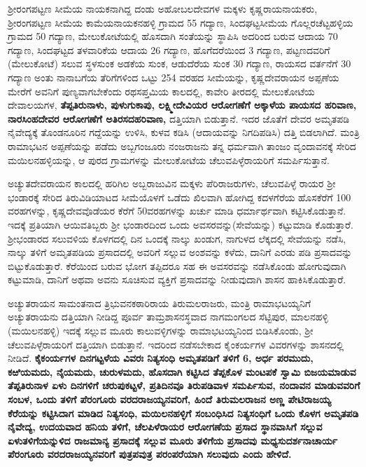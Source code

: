ಶ‍್ರೀರಂಗಪಟ್ಟಣ ಸೀಮೆಯ ನಾಯಕನಾಗಿದ್ದ ದಂಡು ಅಹೋಬಲದೇವಗಳ ಮಕ್ಕಳು ಕೃಷ್ಣರಾಯನಾಯಕರು, ಶ‍್ರೀರಂಗಪಟ್ಟಣ ಸೀಮೆಯ ಕಾಮೆಯನಾಯಕನಹಳ್ಳಿ ಗ್ರಾಮದ 55 ಗದ್ಯಾಣ, ಸಿಂದಘಟ್ಟಸೀಮೆಯ ಗೊಲ್ಲರಚೆಟ್ಟಹಳ್ಳಿಯ ಗ್ರಾಮದ 50 ಗದ್ಯಾಣ, ಮೇಲುಕೋಟೆಯಲ್ಲಿ ಹೊಸದಾಗಿ ಸಂತೆಯನ್ನು ಸ್ಥಾಪಿಸಿ ಅದರಿಂದ ಬರುವ ಆದಾಯ 70 ಗದ್ಯಾಣ, ಸಿಂದಘಟ್ಟದ ತಳವಾರಿಕೆಯ ಆದಾಯ 26 ಗದ್ಯಾಣ, ಹೊಗೆದರೆಯಿಂದ 3 ಗದ್ಯಾಣ, ಪಟ್ಟಣದವರಿಗೆ (ಮೇಲುಕೋಟೆ) ಸಲುವ ಸ್ಥಳಸುಂಕ ಅಡಕೆಯ ಸುಂಕ, ಆಡುದೆರೆಯ ಸುಂಕ 30 ಗದ್ಯಾಣ, ರಾಯಸದ ವರ್ತನೆಗೆ 30 ಗದ್ಯಾಣ ಅಂತು ನಾನಾಬಗೆಯ ತೆರಿಗೆಗಳಿಂದ ಒಟ್ಟು 254 ವರಹದ ಸೀಮೆಯನ್ನು, ಕೃಷ್ಣದೇವರಾಯನ ಅಪ್ಪಣೆಯ ಮೇರೆಗೆ ಅವನಿಗೆ ಪುಣ್ಯವಾಗಬೇಕೆಂದು ರಥಸಪ್ತಮಿಯ ಕಾಲದಲ್ಲಿ, ಕಾವೇರಿ ತೀರದಲ್ಲಿ ಮೇಲುಕೋಟೆಯ ದೇವಾಲಯಗಳ, \textbf{ತೆಪ್ಪತಿರುನಾಳು, ಪುಳುಗುಕಾಪು, ಲಕ್ಷ್ಮೀದೇವಿಯರ ಆರೋಗಣೆಗೆ ಅಕ್ಕಾಳೆಯ ಪಾಯಸದ ಹರಿವಾಣ, ನಾರಸಿಂಹದೇವರ ಆರೋಗಣೆಗೆ ಅತಿರಸದಹರಿವಾಣ, }ದತ್ತಿಯಾಗಿ ಬಿಡುತ್ತಾನೆ. ಇದರ ಜೊತೆಗೆ ದೇವರ ಅಮೃತಪಡಿ ನೈವೇದ್ಯಕ್ಕೆ ತೊಂಡನೂರಿನ ಗದ್ದೆಯನ್ನು ಉಳಿಸಿ, ಕುಳವ ಕಡಿಸಿ (ಆದಾಯವನ್ನು ನಿಗದಿಪಡಿಸಿ) ದತ್ತಿ ಬಿಡಲಾಗಿದೆ. ಮಂತ್ರಿ ರಾಮಾಭಟನ ಅಪ್ಪಣೆಯನ್ನು ಪಡೆದು ಅಬ್ಬಗಂಜೂರು ನಂಜರಾಜನು ತನ್ನ ಧರ್ಮವಾಗಿ ತಾಂಜಂ ವೃಂದಾವನಕ್ಕೆ ಸೇರಿದ ಮಯಿಲನಹಳ್ಳಿಯನ್ನು, ಆ ಪುರದ ಗ್ರಾಮಗಳನ್ನು ಮೇಲುಕೋಟೆಯ ಚೆಲುವಪಿಳ್ಳೆರಾಯರಿಗೆ ಸಮರ್ಪಿಸುತ್ತಾನೆ.

ಅಚ್ಯುತದೇವರಾಯನ ಕಾಲದಲ್ಲಿ ಹರಿಗಿಲ ಅಬ್ಬರಾಜುವಿನ ಮಕ್ಕಳು ಪೆರಿರಾಜರುಗಳು, ಚೆಲುವಪಿಳ್ಳೆ ರಾಯರ ಶ‍್ರೀ ಭಂಡಾರಕ್ಕೆ ಸೇರಿದ ತಿರುವಿಡಿಯಾಟದ ಸೀಮೆಯೊಳಗೆ ಒಡೆದು ಖಿಲವಾಗಿ ಹೋಗಿದ್ದ ಕದಳಗೆರೆಯ ಹೊಸಕೆರೆಗೆ 100 ವರಹಗಳನ್ನು, ಕೃಷ್ಣದೇವವೊಡೆಯರ ಕೆರೆಗೆ 50ವರಹಗಳನ್ನು ಖರ್ಚು ಮಾಡಿ ಧರ್ಮಾರ್ಥವಾಗಿ ಕಟ್ಟಿಸಿಕೊಡುತ್ತಾನೆ. ಇದಕ್ಕೆ ಪ್ರತಿಯಾಗಿ ಆಯಿವತಿಬ್ಬರು ಶ‍್ರೀ ಭಂಡಾರದಿಂದ ಒಂದು ಅವಸರವನ್ನು(ಸೇವೆಯನ್ನು) ಕಟ್ಟುಮಾಡಿ ಕೊಡುತ್ತಾರೆ. ಶ‍್ರೀಭಂಡಾರದ ಸಲುವಳಿಯ ಕೊಳಗದಲ್ಲಿ ದಿನ ಒಂದಕ್ಕೆ ನಾಲ್ಕು ಖಂಡುಗ, ನಾಗುಳದ ಲೆಕ್ಕದಲ್ಲಿ ಸೇವೆಯನ್ನು ನಡೆಸಿ, ನಾಲ್ಕು ತಳಿಗೆ ಅಮೃತಪಡಿಯ ಪ್ರಸಾದದಲ್ಲಿ ಅವರಿಗೆ ಸಲ್ಲುವ ಅಂಶವನ್ನು ಕಳೆದು, ದಾನಿಗೆ ಎರಡು ಪಡಿ ಪ್ರಸಾದವನ್ನು ಬಿಟ್ಟುಕೊಡುತ್ತಾರೆ. ಕೆರೆಯಿಂದ ಬರುವ ಭೋಗ ತಪ್ಪಿದರೂ ಸಹ ಈ ಅವಸರವನ್ನು ನಡೆಸಿಕೊಂಡು ಹೋಗುವುದಾಗಿ ಕಟ್ಟುಮಾಡಿ, ದಾನಿಗೆ ಅಥವಾ ಅವನು ಸೂಚಿಸುವ ವ್ಯಕ್ತಿಗೆ ಪ್ರಸಾದವನ್ನು ನೀಡುವುದಾಗಿ ಶಾಸನ ಹಾಕಿಸಿಕೊಡುತ್ತಾರೆ.

ಅಚ್ಯುತರಾಯನ ಸಾಮಂತನಾದ ತ್ರಿಭುವನಕಠಾರಿರಾಯ ತಿರುಮಲರಾಜರು, ಮಂತ್ರಿ ರಾಮಾಭಟಯ್ಯನಿಗೆ ಅಚ್ಯುತರಾಯನು ದತ್ತಿಯಾಗಿ ನೀಡಿದ್ದ ಪೂರ್ವ ತಾಮ್ರಶಾಸನಸ್ಥವಾದ ನಾಗಮಂಗಲದ ಸೆಟ್ಟಿಪುರ, ಮಾಲನಹಳ್ಳಿ (ಮಯಿಲನಹಳ್ಳಿ) ಇದಕ್ಕೆ ಸಲ್ಲುವ ಮೂರು ಕಾಲುವಳ್ಳಿಗಳನ್ನು ರಾಮಾಭಟಯ್ಯನಿಂದ ಬಿಡಿಸಿಕೊಂಡು, ಶ‍್ರೀ ಚೆಲುವಪಿಳ್ಳೆರಾಯರಿಗೆ ದತ್ತಿಯಾಗಿ ಬಿಡುತ್ತಾನೆ. ಇದರಿಂದ ನಡೆಸಬೇಕಾದ ಕೈಂಕರ್ಯಗಳ ವಿವರಗಳನ್ನು ಶಾಸನದಲ್ಲಿ ನೀಡಿದೆ.\textbf{ ಕೈಕಂರ್ಯಗಳ ದಿನಗಟ್ಟಳೆಯ ವಿವರಃ ನಿತ್ಯಸಂಧಿ ಅಮೃತಪಡಿಗೆ ತಳಿಗೆ 6, ಅರ್ಧ ಪರಮುದು, ಕಱಿಯಮದು, ನೈಯಮದು, ಚುರುಳಮದು, ಹೊಸದಾಗಿ ಕಟ್ಟಿಸಿದ ತೆಪ್ಪಕೊಳ ಮಂಟಪಕೆ ಸ್ವಾಮಿ ಬಿಜಯಮಾಡುವ ತೆಪ್ಪತಿರುನಾಳ ಏಳು ದಿನಗಳಿಗೆ ಚರುಪುಕಟ್ಟಳೆ, ಪ್ರತಿದಿನವೂ ತಿರುಪಡಿವಾಳ ಸಮರ್ಪಿಸುವ, ನಂದಾವನ ಮಾಡುವವರಿಗೆ ಸಂಬಳ, ಒಂದು ತಳಿಗೆ ಪೆರಂಗೂರು ವರದರಾಜಯ್ಯನವರಿಗೆ, ಹಿಂದೆ ತಿರುಮಲರಾಜನ ಅಣ್ಣ ಪೇಟಿರಾಜಯ್ಯ ಕೆರೆಯನ್ನು ಕಟ್ಟಿಸಿದಾಗ ಮಾಡಿದ ನಿತ್ಯಸಂಧಿ, ಮಯಿಲನಹಳ್ಳಿಗೆ ಸಂಬಂಧಿಸಿದ ನಿತ್ಯಸಂಧಿಗೆ ಒಂದು ಕೊಳಗ ಅಮೃತಪಡಿ ನೈವೇದ್ಯ, ಉದಯವಾದ ಹನಿಯ ತಳಿಗೆ, ಚೆಲಪಿಳೆರಾಯರ ಆರೋಗಣೆಯ ಪ್ರಸಾದ ಸ್ಥಾನವಾಸಿಗೆ ಸಲ್ಲುವ ಏಳುತಳಿಗೆಯನ್ನುಳಿದ ರಾಜಮಾನ್ಯ ಪ್ರಸಾದಕ್ಕೆ ಸಲ್ಲುವ ಮೂರು ತಳಿಗೆಯ ಪ್ರಸಾದವು ಮಧ್ಯಸುದರ್ಶನಾಚಾರ್ಯ ಪೆರಂಗೂರು ವರದರಾಜಯ್ಯನವರಿಗೆ ಪುತ್ರಪವುತ್ರ ಪರಂಪರೆಯಾಗಿ ಸಲುವುದು ಎಂದು ಹೇಳಿದೆ.}

